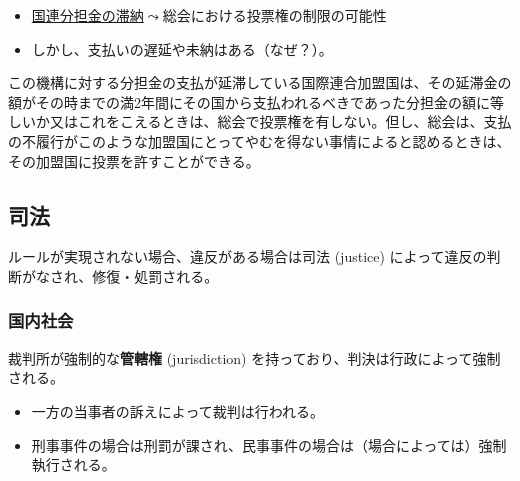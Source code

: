 \documentclass[
  xelatex,
  ja=standard]{bxjsarticle}
\providecommand{\tightlist}{%
  \setlength{\itemsep}{0pt}\setlength{\parskip}{0pt}}\usepackage{longtable,booktabs,array}
\begin{document}
\begin{itemize}
\tightlist
\item
  \href{https://www.un.org/en/ga/contributions/honourroll.shtml}{国連分担金の滞納}\(\leadsto\)総会における投票権の制限の可能性
\item
  しかし、支払いの遅延や未納はある（なぜ？）。
\end{itemize}

\begin{tcolorbox}[enhanced jigsaw, titlerule=0mm, leftrule=.75mm, toprule=.15mm, title=\textcolor{quarto-callout-note-color}{\faInfo}\hspace{0.5em}{\href{https://www.unic.or.jp/info/un/charter/text_japanese/}{国連憲章}　第19条}, left=2mm, colbacktitle=quarto-callout-note-color!10!white, rightrule=.15mm, opacitybacktitle=0.6, colframe=quarto-callout-note-color-frame, breakable, coltitle=black, opacityback=0, bottomrule=.15mm, colback=white, bottomtitle=1mm, toptitle=1mm, arc=.35mm]

この機構に対する分担金の支払が延滞している国際連合加盟国は、その延滞金の額がその時までの満2年間にその国から支払われるべきであった分担金の額に等しいか又はこれをこえるときは、総会で投票権を有しない。但し、総会は、支払の不履行がこのような加盟国にとってやむを得ない事情によると認めるときは、その加盟国に投票を許すことができる。

\end{tcolorbox}

\hypertarget{ux53f8ux6cd5}{%
\subsection{司法}\label{ux53f8ux6cd5}}

ルールが実現されない場合、違反がある場合は司法 (justice)
によって違反の判断がなされ、修復・処罰される。

\hypertarget{ux56fdux5185ux793eux4f1a-2}{%
\subsubsection{国内社会}\label{ux56fdux5185ux793eux4f1a-2}}

裁判所が強制的な\textbf{管轄権} (jurisdiction)
を持っており、判決は行政によって強制される。

\begin{itemize}
\tightlist
\item
  一方の当事者の訴えによって裁判は行われる。
\item
  刑事事件の場合は刑罰が課され、民事事件の場合は（場合によっては）強制執行される。
\end{itemize}
\end{document}
